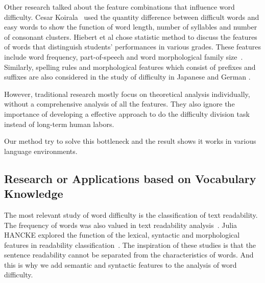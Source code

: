 Other research talked about the feature combinations that influence word difficulty.
Cesar Koirala~ used the quantity difference between difficult words and easy words to show the function of  word length,  number of syllables and  number of consonant clusters.
Hiebert et al chose statistic method to discuss the features of words that distinguish students’ performances in various grades.
These features include word frequency, part-of-speech and word morphological family size~\cite{hiebert2019analysis}.
Similarly, spelling rules and morphological features which consist of prefixes and suffixes are also considered in the study of difficulty in Japanese and German \cite{hancke2012readability,nakanishi2012estimating}.

However, traditional research mostly focus on theoretical analysis individually, without a comprehensive analysis of all the features. 
	They also ignore the importance of developing a effective approach to do the difficulty division task instead of long-term human labors.

Our method try to solve this bottleneck and the result shows it works in various language environments.
\subsection{Research or Applications based on Vocabulary Knowledge}
The most relevant study of word difficulty is the classification of text readability.
The frequency of words was also valued in text readability analysis~\cite{chen2016characterizing}.
Julia HANCKE explored the function of the lexical, syntactic and morphological features in readability classification~\cite{hancke2012readability}.
The inspiration of these studies is that the sentence readability cannot be separated from the characteristics of words.
And this is why we add semantic and syntactic features to the analysis of word difficulty.

 